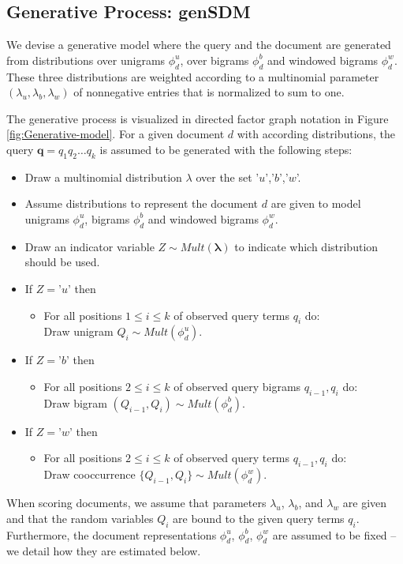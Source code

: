 \documentclass[]{article}
\begin{document}
\subsection{Generative Process: genSDM\label{subsec:Generative-process}}

We devise a generative model where the query and the document are
generated from distributions over unigrams $\phi_{d}^{u}$, over bigrams
$\phi_{d}^{b}$ and windowed bigrams $\phi_{d}^{w}$. These three
distributions are weighted according to a multinomial parameter $(\lambda_{u},\lambda_{b},\lambda_{w})$
of nonnegative entries that is normalized to sum to one.

The generative process is visualized in directed factor graph notation
\cite{dietz2010notation} in Figure \ref{fig:Generative-model}. For
a given document $d$ with according distributions, the query $\mathbf{q}=q_{1}q_{2}\dots q_{k}$
is assumed to be generated with the following steps:

\begin{itemize}[leftmargin=3mm]
\item Draw a multinomial distribution $\lambda$ over the set '$u$','$b$','$w$'.
\item Assume distributions to represent the document $d$ are given to model
unigrams $\phi_{d}^{u}$, bigrams $\phi_{d}^{b}$ and windowed bigrams
$\phi_{d}^{w}$.
\item Draw an indicator variable $Z\sim Mult(\boldsymbol{\lambda})$ to
indicate which distribution should be used.
\item If $Z=\mbox{'}u\mbox{'}$ then 

\begin{itemize}[leftmargin=3mm]
\item For all positions $1\leq i\leq k$ of observed query terms $q_{i}$
do: \\
Draw unigram $Q_{i}\sim Mult(\phi_{d}^{u})$.
\end{itemize}
\item If $Z=\mbox{'}b\mbox{'}$ then 

\begin{itemize}[leftmargin=3mm]
\item For all positions $2\leq i\leq k$ of observed query bigrams $q_{i-1},q_{i}$
do: \\
Draw bigram $(Q_{i-1},Q_{i})\sim Mult(\phi_{d}^{b})$.
\end{itemize}
\item If $Z=\mbox{'}w\mbox{'}$ then 

\begin{itemize}[leftmargin=3mm]
\item For all positions $2\leq i\leq k$ of observed query terms $q_{i-1},q_{i}$
do:\\
 Draw cooccurrence $\{Q_{i-1},Q_{i}\}\sim Mult(\phi_{d}^{w})$.
\end{itemize}
\end{itemize}
When scoring documents, we assume that parameters $\lambda_{u}$,
$\lambda_{b}$, and $\lambda_{w}$ are given and that the random variables
$Q_{i}$ are bound to the given query terms $q_{i}$. Furthermore,
the document representations $\phi_{d}^{u}$, $\phi_{d}^{b}$, $\phi_{d}^{w}$
are assumed to be fixed – we detail how they are estimated below. 
\end{document}
